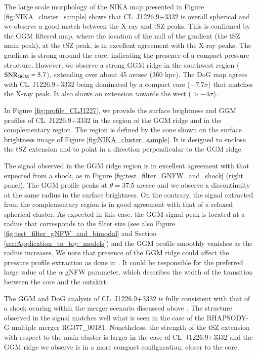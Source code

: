 \documentclass[twocolumn,traditabstract]{aa}
\begin{document}
The large scale morphology of the NIKA map presented in Figure \ref{fig:NIKA_cluster_sample} shows that \mbox{CL~J1226.9+3332} is overall spherical and we observe a good match between the X-ray and tSZ peaks. This is confirmed by the GGM filtered map, where the location of the null of the gradient (the tSZ main peak), at the tSZ peak, is in excellent agreement with the X-ray peaks. The gradient is strong around the core, indicating the presence of a compact pressure structure. However, we observe a strong GGM ridge in the southwest region (${\rm SNR}_{\rm GGM} = 5.7$), extending over about 45 arcsec (360 kpc). The DoG map agrees with \mbox{CL~J1226.9+3332} being dominated by a compact core ($-7.7 \sigma$) that matches the X-ray peak. It also shows an extension towards the west ($> -4 \sigma$).

In Figure \ref{fig:profile_CLJ1227}, we provide the surface brightness and GGM profiles of \mbox{CL~J1226.9+3332} in the region of the GGM ridge and in the complementary region. The region is defined by the cone shown on the surface brightness image of Figure \ref{fig:NIKA_cluster_sample}. It is designed to enclose the tSZ extension and to point in a direction perpendicular to the GGM ridge. 

The signal observed in the GGM ridge region is in excellent agreement with that expected from a shock, as in Figure \ref{fig:test_filter_GNFW_and_shock} (right panel). The GGM profile peaks at $\theta = 37.5$ arcsec and we observe a discontinuity at the same radius in the surface brightness. On the contrary, the signal extracted from the complementary region is in good agreement with that of a relaxed spherical cluster. As expected in this case, the GGM signal peak is located at a radius that corresponds to the filter size (see also Figure \ref{fig:test_filter_gNFW_and_bimodal} and Section \ref{sec:Application_to_toy_models}) and the GGM profile smoothly vanishes as the radius increases. We note that presence of the GGM ridge could affect the pressure profile extraction as done in \cite{Romero2017}. It could be responsible for the preferred large value of the $\alpha$ gNFW parameter, which describes the width of the transition between the core and the outskirt.

The GGM and DoG analysis of \mbox{CL~J1226.9+3332} is fully consistent with that of a shock ocuring within the merger scenario discussed above \citep[see also][for more details]{Adam2015}. The structure observed in the signal matches well what is seen in the case of the RHAPSODY-G multiple merger RG377\_00181. Nonetheless, the strength of the tSZ extension with respect to the main cluster is larger in the case of \mbox{CL~J1226.9+3332} and the GGM ridge we observe is in a more compact configuration, closer to the core.
\end{document}
